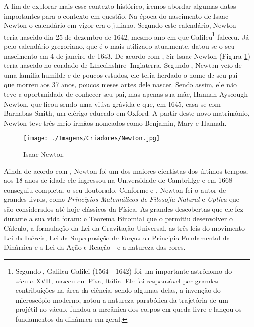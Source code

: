 \documentclass[
	12pt,				%
	openright,			%
    twoside,			%
	a4paper,			%
	chapter=TITLE,		%
	english,			%
	french,				%
	spanish,			%
	brazil				%
	]{abntex2}
\numberwithin{lema}{chapter}
\numberwithin{teorema}{chapter}
\numberwithin{definicao}{chapter}
\numberwithin{exemplo}{chapter}
\numberwithin{figure}{chapter}
\begin{document}
A fim de explorar mais esse contexto histórico, iremos abordar algumas datas importantes para o contexto em questão. Na época do nascimento de Isaac Newton o calendário em vigor era o juliano. Segundo este calendário, Newton teria nascido dia 25 de dezembro de 1642, mesmo ano em que Galileu\footnote{Segundo , Galileu Galilei (1564 - 1642) foi um importante astrônomo do século XVII, nasceu em Pisa, Itália. Ele foi responsável por grandes contribuições na área da ciência, sendo algumas delas, a invenção do microscópio moderno, notou a natureza parabólica da trajetória de um projétil no vácuo, fundou a mecânica dos corpos em queda livre e lançou os fundamentos da dinâmica em geral.} faleceu. Já pelo calendário gregoriano, que é o mais utilizado atualmente, datou-se o seu nascimento em 4 de janeiro de 1643. De acordo com , Sir Isaac Newton (Figura \ref{fig_newton}) teria nascido no condado de Lincolnshire, Inglaterra. Segundo , Newton veio de uma família humilde e de poucos estudos, ele teria herdado o nome de seu pai que morreu aos 37 anos, poucos meses antes dele nascer. Sendo assim, ele não teve a oportunidade de conhecer seu pai, mas apenas sua mãe, Hannah Ayscough Newton, que ficou sendo uma viúva grávida e que, em 1645, casa-se com Barnabas Smith, um clérigo educado em Oxford. A partir deste novo matrimónio, Newton teve três meio-irmãos nomeados como Benjamin, Mary e Hannah.

\begin{figure}[h]
	\caption{Isaac Newton}
	\centering
	\texttt{[image: ./Imagens/Criadores/Newton.jpg]}
	\label{fig_newton}
\end{figure}

Ainda de acordo com , Newton foi um dos maiores cientistas dos últimos tempos, aos 18 anos de idade ele ingressou na Universidade de Cambridge e em 1668, conseguiu completar o seu doutorado. Conforme  e , Newton foi o autor de grandes livros, como \textit{Princípios Matemáticos de Filosofia Natural} e \textit{Óptica} que são considerados até hoje clássicos da Física. As grandes descobertas que ele fez durante a sua vida foram: o Teorema Binomial que o permitiu desenvolver o Cálculo, a formulação da Lei da Gravitação Universal, as três leis do movimento  - Lei da Inércia, Lei da Superposição de Forças ou Princípio Fundamental da Dinâmica e a Lei da Ação e Reação - e a natureza das cores.
\end{document}
